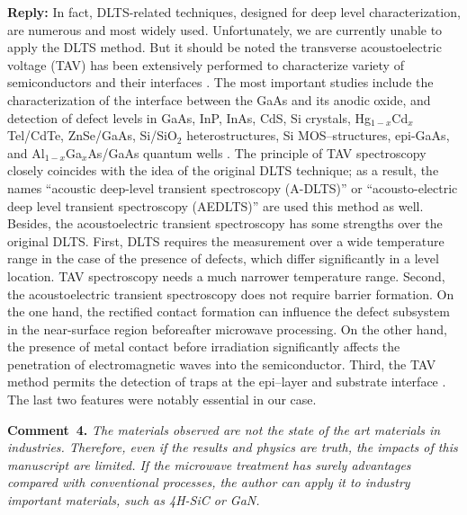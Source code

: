 \documentclass[10pt]{iopart}
\begin{document}
\noindent
\textcolor[rgb]{0.51,0.00,0.00}{\textbf{Reply:}}
In fact, DLTS-related techniques, designed for deep level characterization,
are numerous and most widely used.
Unfortunately, we are currently unable to apply the DLTS method.
But it should be noted the transverse acoustoelectric voltage (TAV)
has been extensively performed to characterize variety of  semiconductors and their
interfaces
\cite{TAV:1992ZnSeGaAsphoto,TAV:2003MIS_hetero,TAV:1989hetero,TAV:1993general,TAV:1991SiSiO2,TAV:1989SiGaAsnodefect,
TAV:1991gener,TAV:1999GaAs_AlGaAs,TAV:1993MIS,TAV:1991SiMOS,TAV:1993GaAs,OstrovPAN,OlikhSSC,OstrovskiiSST}.
The most important studies include the
characterization of the  interface between  the GaAs and  its anodic oxide,
and detection of  defect levels
in GaAs, InP, InAs, CdS, Si crystals,
Hg$_{1-x}$Cd$_x$Tel/CdTe, ZnSe/GaAs, Si/SiO$_2$ heterostructures,
Si MOS--structures,
epi-GaAs,
and Al$_{1-x}$Ga$_x$As/GaAs quantum wells
\cite{TAV:1991gener,TAV:1992ZnSeGaAsphoto,TAV:1991SiSiO2,OlikhSSC,TAV:1993MIS,TAV:1999GaAs_AlGaAs}.
The  principle of TAV  spectroscopy closely coincides with the idea  of  the original  DLTS
technique; as a result, the names
``acoustic  deep-level  transient spectroscopy
(A-DLTS)''
 \cite{TAV:2003MIS_hetero,TAV:1999GaAs_AlGaAs,TAV:1993MIS,TAV:1991SiMOS}
or ``acousto-electric  deep  level  transient  spectroscopy
(AEDLTS)''
\cite{TAV:1993GaAs}
are used this method as well.
Besides, the acoustoelectric transient spectroscopy has some strengths over the original  DLTS.
First, DLTS requires the measurement over a wide temperature range
in the case of the presence of defects, which differ significantly in a level location.
TAV spectroscopy needs a much narrower temperature range.
Second, the acoustoelectric transient spectroscopy does not require barrier formation.
On the one hand, the rectified contact formation can influence the defect subsystem
in the near-surface region before\/after microwave processing.
On the other hand, the presence of metal contact before irradiation
significantly affects the penetration of electromagnetic waves into the semiconductor.
Third, the TAV method permits the detection of traps at the
epi–layer and substrate interface \cite{OstrovPAN,OlikhSSC,OstrovskiiSST}.
The last two features were notably essential in our case.







\vspace{1cm}
\noindent
\textcolor[rgb]{0.00,0.50,1.00}{\textbf{Comment~4.}}
\emph{The materials observed are not the state of the art materials in industries.
Therefore, even if the results and physics are truth,
the impacts of this manuscript are limited.
If the microwave treatment has surely advantages compared
with conventional processes, the author can apply it to industry important materials, such as 4H-SiC or GaN.}
\end{document}
